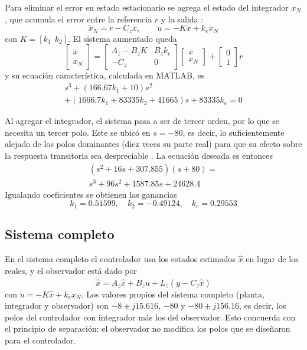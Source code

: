 \documentclass[conference]{IEEEtran}
\begin{document}
Para eliminar el error en estado estacionario se agrega el estado del integrador $x_N$, que acumula el error entre la referencia $r$ y la salida \cite{nise}:
\begin{equation}
\dot{x}_N = r - C_z x, \qquad u = -Kx + k_e x_N
\end{equation}
con $K = [k_1\ \ k_2]$. El sistema aumentado queda
\begin{equation}
\begin{bmatrix} \dot{x} \\ \dot{x}_N \end{bmatrix} =
\begin{bmatrix} A_z - B_z K & B_z k_e \\ -C_z & 0 \end{bmatrix}
\begin{bmatrix} x \\ x_N \end{bmatrix} +
\begin{bmatrix} 0 \\ 1 \end{bmatrix} r
\end{equation}
y su ecuación característica, calculada en MATLAB, es
\begin{multline}
s^3 + (166.67k_1 + 10)s^2 \\
+ (1666.7k_1 + 83335k_2 + 41665)s + 83335k_e = 0
\end{multline}

Al agregar el integrador, el sistema pasa a ser de tercer orden, por lo que se necesita un tercer polo. Este se ubicó en $s = -80$, es decir, lo suficientemente alejado de los polos dominantes (diez veces su parte real) para que su efecto sobre la respuesta transitoria sea despreciable \cite{nise}. La ecuación deseada es entonces
\begin{multline}
(s^2 + 16s + 307.855)(s + 80) = \\
s^3 + 96s^2 + 1587.85s + 24628.4
\end{multline}
Igualando coeficientes se obtienen las ganancias
\begin{equation}
k_1 = 0.51599,\quad k_2 = -0.49124,\quad k_e = 0.29553
\end{equation}

\subsection{Sistema completo}

En el sistema completo el controlador usa los estados estimados $\hat{x}$ en lugar de los reales, y el observador está dado por
\begin{equation}
\dot{\hat{x}} = A_z \hat{x} + B_z u + L_z (y - C_z \hat{x})
\end{equation}
con $u = -K\hat{x} + k_e x_N$. Los valores propios del sistema completo (planta, integrador y observador) son $-8 \pm j15.616$, $-80$ y $-80 \pm j156.16$, es decir, los polos del controlador con integrador más los del observador. Esto concuerda con el principio de separación: el observador no modifica los polos que se diseñaron para el controlador.
\end{document}

